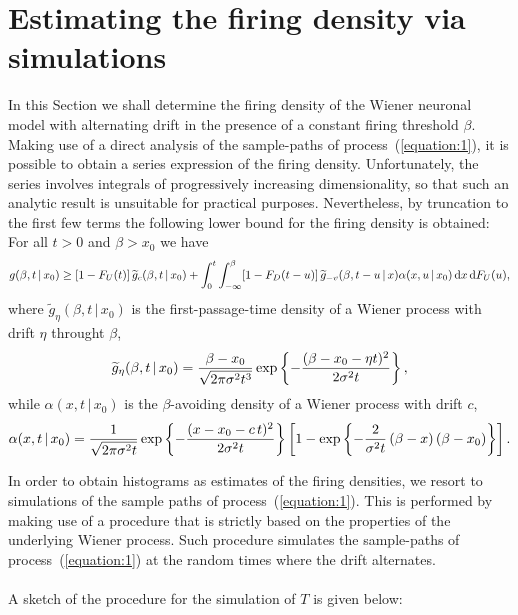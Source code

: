 \section{Estimating the firing density via simulations}\label{section:4}
In this Section we shall determine the firing density of the Wiener neuronal
model with alternating drift in the presence of a constant firing threshold $\beta$.
Making use of a direct analysis of the sample-paths of process~(\ref{equation:1}), 
it is possible to obtain a series expression of the firing density. Unfortunately, 
the series involves integrals of progressively increasing dimensionality, so that 
such an analytic result is unsuitable for practical purposes. Nevertheless, by 
truncation to the first few terms the following lower bound for the firing density 
is obtained: For all $t>0$ and $\beta>x_0$ we have 
$$
g(\beta,t\,|\,x_0) \geq [1-F_U(t)]\,\widetilde g_c(\beta,t\,|\,x_0) + \int_0^t\int_{-\infty}^{\beta}[1-F_D(t-u)]\,\widetilde g_{-v}(\beta,t-u\,|\,x) \alpha(x,u\,|\,x_0)\,{\rm d}x\,{\rm d}F_U(u),$$
where $\widetilde g_{\eta}(\beta,t\,|\,x_0)$ is the first-passage-time density 
of a Wiener process with drift $\eta$ throught $\beta$,  
%
$$
  \widetilde g_{\eta}(\beta,t\,|\,x_0)
 ={\beta-x_0\over \sqrt{2\pi\sigma^2 t^3}} 
 \exp\left\{-{(\beta-x_0-\eta t)^2\over 2\sigma^2 t}\right\},
$$
while $\alpha(x,t\,|\,x_0)$ is the $\beta$-avoiding density of a Wiener process 
with drift $c$,  
%
$$ \alpha(x,t\,|\,x_0) = {1\over \sqrt{2\pi\sigma^2 t}} 
 \exp\left\{-{(x-x_0-c\,t)^2\over 2\sigma^2 t}\right\}  
 \left[1-\exp\left\{-{2\over\sigma^2 t}\,(\beta-x)\,(\beta-x_0)\right\}\right].$$
%
\par
In order to obtain histograms as estimates of the firing densities, we resort 
to simulations of the sample paths of process~(\ref{equation:1}). This is 
performed by making use of a procedure that is strictly based on 
the properties of the underlying Wiener process. Such procedure simulates 
the sample-paths of process~(\ref{equation:1}) at the random 
times where the drift alternates.
\\ \smallskip\\
A sketch of the procedure for the simulation of $T$ is given below:
\\ \smallskip\\
